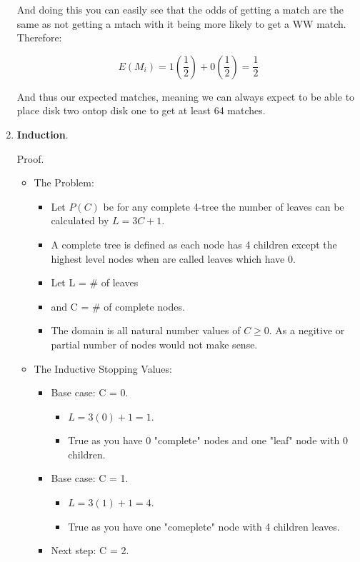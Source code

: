 \documentclass{article}
\begin{document}
\begin{enumerate}
    And doing this you can easily see that the odds of getting a match are the same as not getting a mtach with it being more likely to get a WW match. Therefore:

    \[E(M_i) = 1(\frac{1}{2}) + 0(\frac{1}{2}) = \frac{1}{2}\]

    And thus our expected matches,  meaning we can always expect to be able to place disk two ontop disk one to get at least 64 matches.

    \item \textbf{Induction}.
    
    Proof.
    
    \begin{itemize}
      \item The Problem:
      \begin{itemize}
        \item Let $P(C)$ be for any complete 4-tree the number of leaves can be calculated by $L = 3C + 1$.
        \item A complete tree is defined as each node has 4 children except the highest level nodes when are called leaves which have 0. 
        \item Let L = \# of leaves
        \item and C = \# of complete nodes.
        \item The domain is all natural number values of $C \geq 0$. As a negitive or partial number of nodes would not make sense.
      \end{itemize}
      \item The Inductive Stopping Values:
      \begin{itemize}
        \item Base case: C = 0.
        \begin{itemize}
          \item $L = 3(0) + 1 = 1$. 
          \item True as you have 0 "complete" nodes and one "leaf" node with 0 children.          
        \end{itemize}
        \item Base case: C = 1.
        \begin{itemize}
          \item $L = 3(1) + 1 = 4$. 
          \item True as you have one "comeplete" node with 4 children leaves.          
        \end{itemize}
        \item Next step: C = 2.

\end{itemize}
\end{itemize}
\end{enumerate}
\end{document}
